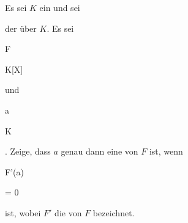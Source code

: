 {


Es sei $K$ ein
 und sei

 der  über $K$. Es sei


\mavergleichskette

{\vergleichskette

{ F
}

{ \in }{ K[X]
}

{  }{
}

{    }{
}

{   }{
}

}
{}{}{}
und


\mavergleichskette

{\vergleichskette

{ a
}

{ \in }{ K
}

{  }{
}

{    }{
}

{   }{
}

}
{}{}{.}
Zeige, dass $a$ genau dann eine
von $F$ ist, wenn


\mavergleichskette

{\vergleichskette

{ F'(a)
}

{ = }{ 0
}

{  }{
}

{    }{
}

{   }{
}

}
{}{}{}
ist, wobei $F'$ die
von $F$ bezeichnet.


}

{} {}



{}

